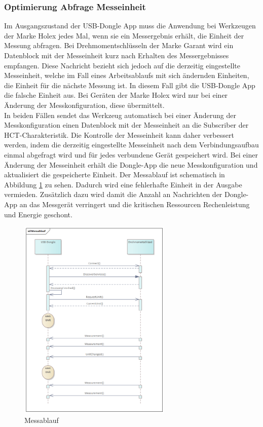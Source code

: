 \subsubsection{Optimierung Abfrage Messeinheit}
\label{OptimierungAbfrage}
Im Ausgangszustand der \ac{USB}-Dongle App muss die Anwendung bei Werkzeugen der Marke Holex jedes Mal, wenn sie ein Messergebnis erhält, die Einheit der Messung abfragen. Bei Drehmomentschlüsseln der Marke Garant wird ein Datenblock mit der Messeinheit kurz nach Erhalten des Messergebnisses empfangen. Diese Nachricht bezieht sich jedoch auf die derzeitig eingestellte Messeinheit, welche im Fall eines Arbeitsablaufs mit sich ändernden Einheiten, die Einheit für die nächste Messung ist. In diesem Fall gibt die \ac{USB}-Dongle App die falsche Einheit aus. Bei Geräten der Marke Holex wird nur bei einer Änderung der Messkonfiguration, diese übermittelt.\\
In beiden Fällen sendet das Werkzeug automatisch bei einer Änderung der Messkonfiguration einen Datenblock mit der Messeinheit an die Subscriber der \ac{HCT}-Charakteristik. Die Kontrolle der Messeinheit kann daher verbessert werden, indem die derzeitig eingestellte Messeinheit nach dem Verbindungsaufbau einmal abgefragt wird und für jedes verbundene Gerät gespeichert wird. Bei einer Änderung der Messeinheit erhält die Dongle-App die neue Messkonfiguration und aktualisiert die gespeicherte Einheit. Der Messablauf ist schematisch in Abbildung \ref{fig:Messablauf} zu sehen. Dadurch wird eine fehlerhafte Einheit in der Ausgabe vermieden. Zusätzlich dazu wird damit die Anzahl an Nachrichten der Dongle-App an das Messgerät verringert und die kritischen Ressourcen Rechenleistung und Energie geschont.

\begin{figure}[H] 
	\centering
	\includegraphics[width=0.65\textwidth]{figures/Messablauf.png}
	\caption{Messablauf}
	\label{fig:Messablauf}
\end{figure}

